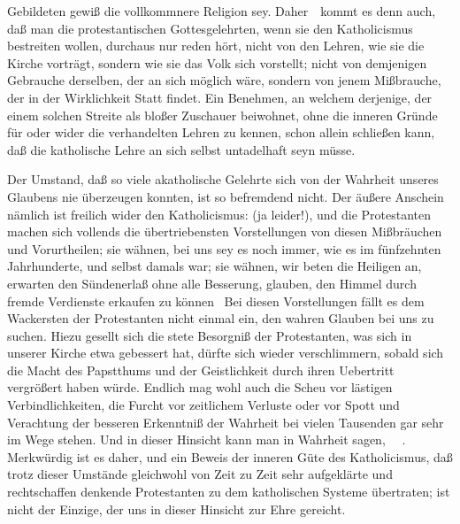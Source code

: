 \begin{aufza}
\begin{aufzb}
Gebildeten gewiß die vollkommnere Religion sey. Daher~\ kommt es denn auch, daß man die protestantischen Gottesgelehrten, wenn sie den Katholicismus bestreiten wollen, durchaus nur reden hört, nicht von den Lehren, wie sie die Kirche vorträgt, sondern wie sie das Volk sich vorstellt; nicht von demjenigen Gebrauche derselben, der an sich möglich wäre, sondern von jenem Mißbrauche, der in der Wirklichkeit Statt findet. Ein Benehmen, an welchem derjenige, der einem solchen Streite als bloßer Zuschauer beiwohnet, ohne die inneren Gründe für oder wider die verhandelten Lehren zu kennen, schon allein schließen kann, daß die katholische Lehre an sich selbst untadelhaft seyn müsse.
\item Der Umstand, daß so viele akatholische Gelehrte sich von der Wahrheit unseres Glaubens nie überzeugen konnten, ist so befremdend nicht. Der äußere Anschein nämlich ist freilich wider den Katholicismus:  (ja leider!), und die Protestanten machen sich vollends die übertriebensten Vorstellungen von diesen Mißbräuchen und Vorurtheilen; sie wähnen, bei uns sey es noch immer, wie es im fünfzehnten Jahrhunderte, und selbst damals  war; sie wähnen, wir beten die Heiligen an, erwarten den Sündenerlaß ohne alle Besserung, glauben, den Himmel durch fremde Verdienste erkaufen zu können \usw\ Bei diesen Vorstellungen fällt es dem Wackersten der Protestanten nicht einmal ein, den wahren Glauben bei uns zu suchen. Hiezu gesellt sich die stete Besorgniß der Protestanten, was sich in unserer Kirche etwa gebessert hat, dürfte sich wieder verschlimmern, sobald sich die Macht des Papstthums und der Geistlichkeit durch ihren Uebertritt vergrößert haben würde. Endlich mag wohl auch die Scheu vor lästigen Verbindlichkeiten, die Furcht vor zeitlichem Verluste oder vor Spott und Verachtung der besseren Erkenntniß der Wahrheit bei vielen Tausenden gar sehr im Wege stehen. Und in dieser Hinsicht kann man in Wahrheit sagen, ~\ . Merkwürdig ist es daher, und ein Beweis der inneren Güte des Katholicismus, daß trotz dieser Umstände gleichwohl von Zeit zu Zeit sehr aufgeklärte und rechtschaffen denkende Protestanten zu dem katholischen Systeme übertraten;  ist nicht der Einzige, der uns in dieser Hinsicht zur Ehre gereicht.

\end{aufzb}
\end{aufza}
